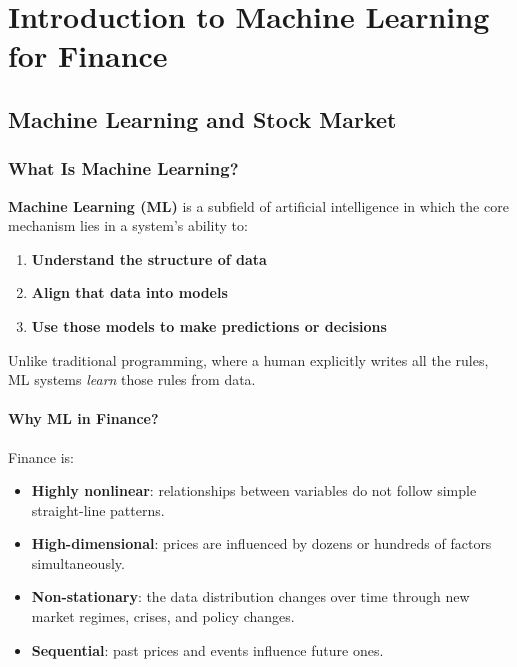 \documentclass[12pt,openany]{book}
\begin{document}
\chapter{Introduction to Machine Learning for Finance}

\section{Machine Learning and Stock Market}


\subsection{What Is Machine Learning?}

\textbf{Machine Learning (ML)} is a subfield of artificial intelligence in which the core mechanism lies in a system's ability to:

\begin{enumerate}[leftmargin=*]
    \item \textbf{Understand the structure of data}
    \item \textbf{Align that data into models}
    \item \textbf{Use those models to make predictions or decisions}
\end{enumerate}

Unlike traditional programming, where a human explicitly writes all the rules, ML systems \textit{learn} those rules from data.

\subsubsection{Why ML in Finance?}

Finance is:
\begin{itemize}[leftmargin=*]
    \item \textbf{Highly nonlinear}: relationships between variables do not follow simple straight-line patterns.
    \item \textbf{High-dimensional}: prices are influenced by dozens or hundreds of factors simultaneously.
    \item \textbf{Non-stationary}: the data distribution changes over time through new market regimes, crises, and policy changes.
    \item \textbf{Sequential}: past prices and events influence future ones.
\end{itemize}
\end{document}
